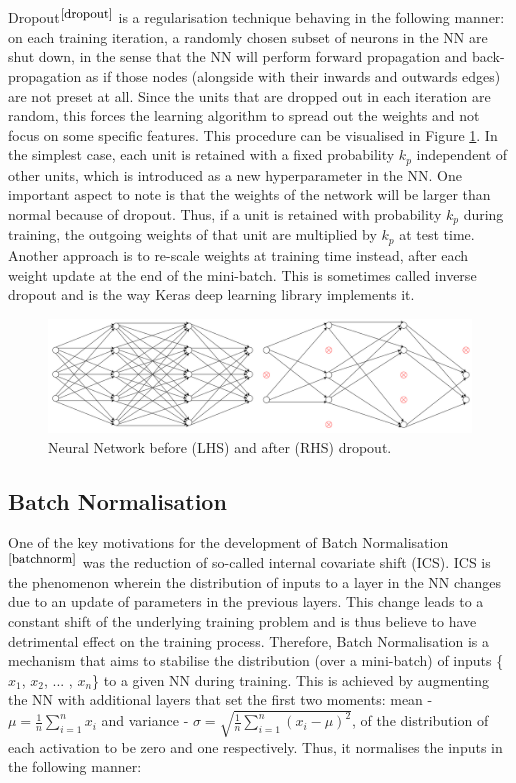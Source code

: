 Dropout$^{\small \cite{dropout}}$ is a regularisation technique behaving in the following manner: on each training iteration, a randomly chosen subset of neurons in the NN are shut down, in the sense that the NN will perform forward propagation and back-propagation as if those nodes (alongside with their inwards and outwards edges) are not preset at all. Since the units that are dropped out in each iteration are random, this forces the learning algorithm to spread out the weights and not focus on some specific features. This procedure can be visualised in Figure \ref{dropout}. In the simplest case, each unit is retained with a fixed probability $k_p$ independent of other units, which is introduced as a new hyperparameter in the NN. One important aspect to note is that the weights of the network will be larger than normal because of dropout. Thus, if a unit is retained with probability $k_p$ during training, the outgoing weights of that unit are multiplied by $k_p$ at test
time. Another approach is to re-scale weights at training time instead, after each weight update at the end of the mini-batch. This is sometimes called inverse dropout and is the way Keras deep learning library implements it. 


\begin{figure}[H]
  \centering
 \centerline{ \includegraphics[scale = 0.5]{Images/dropout_new.png}}

  \caption{Neural Network before (LHS) and after (RHS) dropout.}
  \label{dropout}
\end{figure}

\subsection{Batch Normalisation}


One of the key motivations for the development of Batch Normalisation$^{\small \cite{batchnorm}}$ was the reduction of so-called internal covariate shift (ICS). ICS is the phenomenon wherein the distribution of inputs to a layer in the NN changes due to an update of parameters in the previous layers. This change leads to a constant shift of the underlying training problem and is thus believe to have detrimental effect on the training process. Therefore, Batch Normalisation is a mechanism that aims to stabilise the distribution (over a mini-batch) of inputs \{$x_1$, $x_2$, ... , $x_n$\} to a given NN during training. This is achieved by augmenting the NN with additional layers that set the first two moments: mean - $\mu = \frac{1}{n} \sum_{i=1}^n x_i$ and variance - $\sigma = \sqrt{\frac{1}{n} \sum_{i=1}^n (x_i - \mu) ^ 2}$, of the distribution of each activation to be zero and one respectively. Thus, it normalises the inputs in the following manner: 

